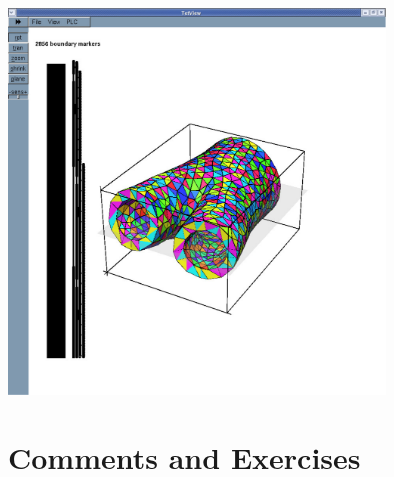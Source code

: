  
\begin{DoxyImage}
\includegraphics[width=0.75\textwidth]{solid_mult_ids}
\end{DoxyImage}




 

\hypertarget{index_comm_and_ex}{}\section{Comments and Exercises}\label{index_comm_and_ex}

